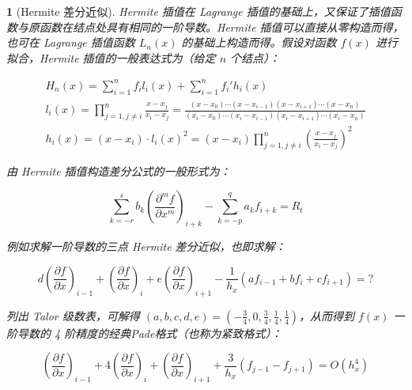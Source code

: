 \documentclass[zihao=5,UTF8]{report}
\theoremstyle{MyTheoremStyle} %
\theoremstyle{MySubsubsectionStyle} %
\newtheorem{definition}{}
\begin{document}
\begin{definition}[Hermite 差分近似]

Hermite 插值在 Lagrange 插值的基础上，又保证了插值函数与原函数在结点处具有相同的一阶导数。Hermite 插值可以直接从零构造而得，也可在 Lagrange 插值函数 $L_n(x)$ 的基础上构造而得。假设对函数 $f(x)$ 进行拟合，Hermite 插值的一般表达式为（给定 $n$ 个结点）：

\begin{gather}
H_n(x) = \sum_{i=1}^{n} f_il_i(x)+\sum_{i=1}^{n} f_i'h_i(x) \\ 
l_i(x) = \prod_{j=1,j\neq i}^{n}\frac{x - x_j}{x_i - x_j} = \frac{(x-x_{0})\cdots(x-x_{i-1})(x-x_{i+1})\cdots(x-x_{n})}{(x_{i}-x_{0})\cdots(x_{i}-x_{i-1})(x_{i}-x_{i+1})\cdots(x_{i}-x_{n})}  \\ 
h_i(x) =(x-x_i)\cdot l_i(x)^2 = (x-x_i) \prod_{j=1,j\neq i}^{n}\left(   \frac{x - x_j}{x_i - x_j}  \right)^2 
\end{gather}


由 Hermite 插值构造差分公式的一般形式为：

\begin{equation}
    \sum_{k=-r}^{s}b_{k}\left(\frac{\partial^{m}f}{\partial x^{m}}\right)_{i+k}-\sum_{k=-p}^{q}a_{k}f_{i+k}=R_{t}
\end{equation}

例如求解一阶导数的三点 Hermite 差分近似，也即求解：

\begin{equation}
    d\left(\frac{\partial f}{\partial x}\right)_{i-1}+\left(\frac{\partial f}{\partial x}\right)_{i}+e\left(\frac{\partial f}{\partial x}\right)_{i+1}-\frac{1}{h_x}(af_{i-1}+bf_{i}+cf_{i+1})=?
\end{equation}

列出 Talor 级数表，可解得 $(a,b,c,d,e)=(-\frac34,0,\frac34,\frac14,\frac14)$，从而得到 $f(x)$ 一阶导数的 4 阶精度的经典Pade格式（也称为紧致格式）：

\begin{equation}
    \left(\frac{\partial f}{\partial x}\right)_{i-1}+4\left(\frac{\partial f}{\partial x}\right)_i+\left(\frac{\partial f}{\partial x}\right)_{i+1}+\frac{3}{h_x}(f_{j-1}-f_{j+1})=O(h_x^4)
\end{equation}



\end{definition}
\end{document}
